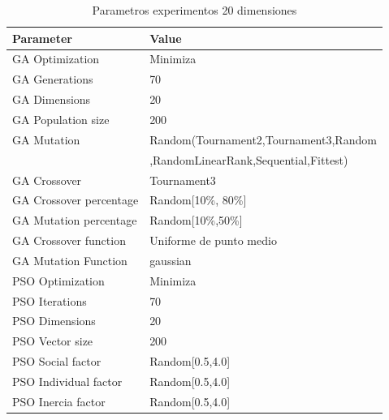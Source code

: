 \documentclass[runningheads]{llncs}
\begin{document}
          \begin{table}[htp]
            \caption{Parametros experimentos 20 dimensiones}
            \label{table:ga-pso-parameters-20}
            \centering
            \begin{tabular}{|l|l|}
            \hline
            Parameter & Value \\
            \hline
            \hline
            GA Optimization & Minimiza \\
            \hline
            GA Generations & 70 \\
            \hline
            GA Dimensions & 20 \\
            \hline
            GA Population size & 200 \\
            \hline
            GA Mutation & Random(Tournament2,Tournament3,Random \\
            &  ,RandomLinearRank,Sequential,Fittest)\\
            \hline
            GA Crossover & Tournament3 \\
            \hline
            GA Crossover percentage & Random[10\%, 80\%] \\
            \hline
            GA Mutation percentage & Random[10\%,50\%] \\
            \hline
            GA Crossover function & Uniforme de punto medio \\
            \hline
            GA Mutation Function & gaussian \\
            \hline
            PSO Optimization & Minimiza \\
            \hline
            PSO Iterations & 70 \\
            \hline
            PSO Dimensions & 20 \\
            \hline
            PSO Vector size & 200 \\
            \hline
            PSO Social factor & Random[0.5,4.0] \\
            \hline
            PSO Individual factor & Random[0.5,4.0] \\
            \hline
            PSO Inercia factor & Random[0.5,4.0] \\
            \hline
            \end{tabular}
            \end{table}
          
\end{document}
